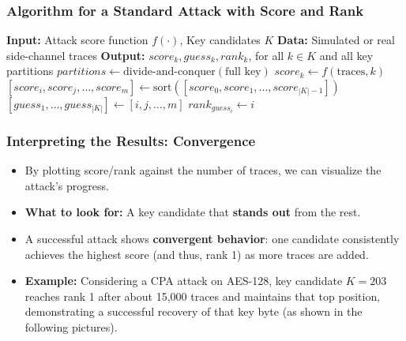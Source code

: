\begin{frame}
    \frametitle{Algorithm for a Standard Attack with Score and Rank}
    
    \begin{algorithm}[H]
    \begin{algorithmic}[1] 
        \Statex \textbf{Input:} Attack score function $f(\cdot)$, Key candidates $K$
        \Statex \textbf{Data:} Simulated or real side-channel traces
        \Statex \textbf{Output:} $score_k, guess_k, rank_k$, for all $k \in K$ and all key partitions 
        \State $partitions \gets \text{divide-and-conquer}(\text{full key})$
                \State $score_k \gets f(\text{traces}, k)$
            \EndFor
            \State $[score_i, score_j, \dots, score_m] \gets \text{sort}([score_0, score_1, \dots, score_{|K|-1}])$
            \State $[guess_1, \dots, guess_{|K|}] \gets [i, j, \dots, m]$
                \State $rank_{guess_i} \gets i$
            \EndFor
        \EndFor
    \end{algorithmic}
    \end{algorithm}
\end{frame}

\begin{frame}
    \frametitle{Interpreting the Results: Convergence}
    \begin{itemize}
        \item By plotting score/rank against the number of traces, we can visualize the attack's progress.
        \item \textbf{What to look for:} A key candidate that \textbf{stands out} from the rest.
        \item A successful attack shows \textbf{convergent behavior}: one candidate consistently achieves the highest score (and thus, rank 1) as more traces are added.
        \item \textbf{Example:} Considering a CPA attack on AES-128, key candidate $K=203$ reaches rank 1 after about 15,000 traces and maintains that top position, demonstrating a successful recovery of that key byte (as shown in the following pictures). 
    \end{itemize}
\end{frame}

